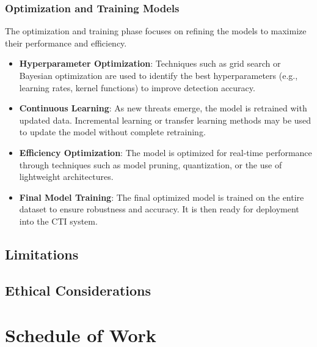 \documentclass[a4paper,twoside,12pt]{report}
\begin{document}
\subsection{Optimization and Training Models}
The optimization and training phase focuses on refining the models to maximize their performance and efficiency.

\begin{itemize}
    \item \textbf{Hyperparameter Optimization}: Techniques such as grid search or Bayesian optimization are used to identify the best hyperparameters (e.g., learning rates, kernel functions) to improve detection accuracy.
    \item \textbf{Continuous Learning}: As new threats emerge, the model is retrained with updated data. Incremental learning or transfer learning methods may be used to update the model without complete retraining.
    \item \textbf{Efficiency Optimization}: The model is optimized for real-time performance through techniques such as model pruning, quantization, or the use of lightweight architectures.
    \item \textbf{Final Model Training}: The final optimized model is trained on the entire dataset to ensure robustness and accuracy. It is then ready for deployment into the CTI system.
\end{itemize}

\section{Limitations}
\section{Ethical Considerations}


\chapter{Schedule of Work}
\end{document}

